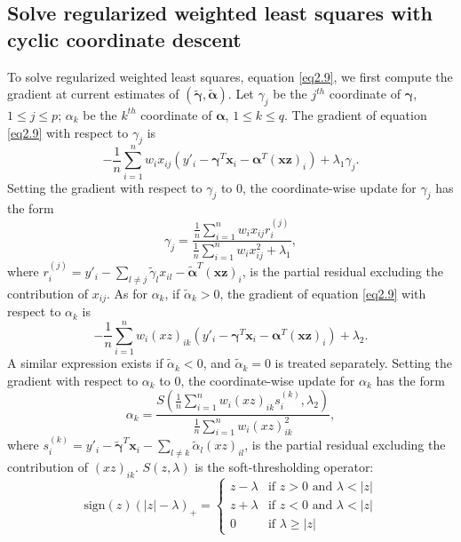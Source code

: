 \subsection{Solve regularized weighted least squares with cyclic coordinate descent}
\label{a.2}
To solve regularized weighted least squares, equation \eqref{eq2.9}, we first compute the gradient at current estimates of $(\tilde{\bm{\gamma}}, \tilde{\bm{\alpha}})$. Let $\gamma_j$ be the $j^{th}$ coordinate of $\bm{\gamma}$, $1\leq j\leq p$; $\alpha_k$ be the $k^{th}$ coordinate of $\bm{\alpha}$, $1\leq k\leq q$. The gradient of equation \ref{eq2.9} with respect to $\gamma_j$ is 
\begin{displaymath}
-\frac{1}{n} \sum_{i=1}^n w_ix_{ij}(y'_i-\bm{\gamma}^T\bm{x}_i-\bm{\alpha}^T(
\bm{xz})_i) + \lambda_1\gamma_j.
\end{displaymath}
Setting the gradient with respect to $\gamma_j$ to 0, the coordinate-wise update for $\gamma_j$ has the form 
\begin{displaymath}
\gamma_j = \frac{\frac{1}{n}\sum_{i=1}^n w_ix_{ij}r_i^{(j)}}{\frac{1}{n}\sum_{i=1}^nw_ix_{ij}^2+\lambda_1},
\end{displaymath}
where $r_i^{(j)}=y'_i-\sum_{l\neq j}\tilde{\gamma}_lx_{il}-\tilde{\bm{\alpha}}^T(\bm{xz})_i$, is the partial residual excluding the contribution of $x_{ij}$. As for $\alpha_k$, if $\tilde{\alpha}_k>0$, the gradient of equation \eqref{eq2.9} with respect to $\alpha_k$ is 
\begin{displaymath}
-\frac{1}{n}\sum_{i=1}^n w_i(xz)_{ik}(y'_i-\bm{\gamma}^T\bm{x}_i-\bm{\alpha}^T(
\bm{xz})_i) + \lambda_2.
\end{displaymath}
A similar expression exists if $\tilde{\alpha}_k<0$, and $\tilde{\alpha}_k=0$ is treated separately. Setting the gradient with respect to $\alpha_k$ to 0, the coordinate-wise update for $\alpha_k$ has the form 
\begin{displaymath}
\alpha_k = \frac{S(\frac{1}{n}\sum_{i=1}^n w_i(xz)_{ik}s_i^{(k)}, \lambda_2)}{\frac{1}{n}\sum_{i=1}^n w_i(xz)_{ik}^2},
\end{displaymath}
where $s_i^{(k)}=y'_i-\tilde{\bm{\gamma}}^T\bm{x}_i-\sum_{l\neq k}\tilde{\alpha}_l(xz)_{il}$, is the partial residual excluding the contribution of $(xz)_{ik}$. $S(z,\lambda)$ is the soft-thresholding operator:
\begin{equation*}
    \text{sign}(z)(|z|-\lambda)_+ = 
        \begin{cases}
            z-\lambda & \text{if $z>0$ and $\lambda<|z|$}\\
            z+\lambda & \text{if $z<0$ and $\lambda<|z|$}\\
            0 & \text{if $\lambda \geq |z|$}
        \end{cases}       
\end{equation*}


